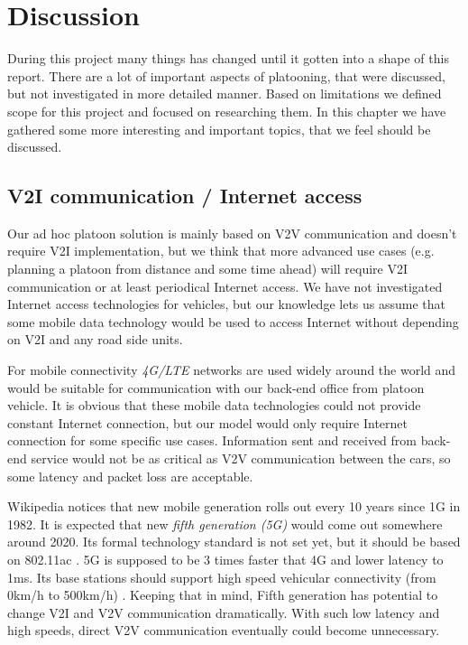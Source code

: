 \section{Discussion}\label{sec:discussion}
%
During this project many things has changed until it gotten into a shape of this report. There are a lot of important aspects of platooning, that were discussed, but not investigated in more detailed manner. Based on limitations we defined scope for this project and focused on researching them. In this chapter we have gathered some more interesting and important topics, that we feel should be discussed. \par
% 
\subsection{V2I communication / Internet access}
%
Our ad hoc platoon solution is mainly based on V2V communication and doesn't require V2I implementation, but we think that more advanced use cases (e.g. planning a platoon from distance and some time ahead) will require V2I communication or at least periodical Internet access. We have not investigated Internet access technologies for vehicles, but our knowledge lets us assume that some mobile data technology would be used to access Internet without depending on V2I and any road side units.\par
% 
For mobile connectivity \emph{4G/LTE} networks are used widely around the world and would be suitable for communication with our back-end office from platoon vehicle. It is obvious that these mobile data technologies could not provide constant Internet connection, but our model would only require Internet connection for some specific use cases. Information sent and received from back-end service would not be as critical as V2V communication between the cars, so some latency and packet loss are acceptable.\par
% 
Wikipedia notices that new mobile generation rolls out every 10 years since 1G in 1982. It is expected that new \emph{fifth generation (5G)} would come out somewhere around 2020. Its formal technology standard is not set yet, but it should be based on 802.11ac \cite{Mercer2017What5G}.
5G is supposed to be 3 times faster that 4G and lower latency to 1ms. Its base stations should support high speed vehicular connectivity (from 0km/h to 500km/h) \cite{Anthony20175GKm}. Keeping that in mind, Fifth generation has potential to change V2I and V2V communication dramatically. With such low latency and high speeds, direct V2V communication eventually could become unnecessary.
%
% 
